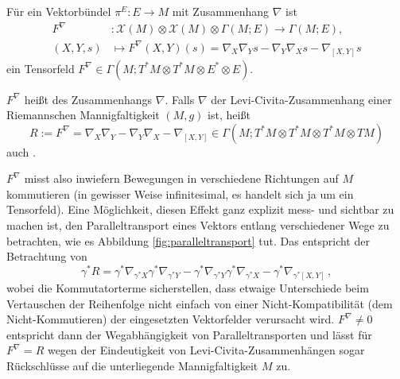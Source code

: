 \begin{satz}
Für ein Vektorbündel $\pi^E: E \rightarrow M$ mit Zusammenhang $\nabla$ ist
\begin{equation}
\begin{split}
F^\nabla&: \mathcal{X}(M) \otimes \mathcal{X}(M) \otimes \Gamma(M; E) \rightarrow \Gamma(M; E),
\\
(X, Y, s) &\mapsto F^\nabla(X, Y)(s) = \nabla_X \nabla_Y s - \nabla_Y \nabla_X s - \nabla_{[X, Y]} s
\end{split}
\end{equation}
ein Tensorfeld $F^\nabla \in \Gamma(M; T^* M \otimes T^* M \otimes E^* \otimes E)$.
\end{satz}

\begin{defi}
$F^\nabla$ heißt  des Zusammenhangs $\nabla$. Falls $\nabla$ der Levi-Civita-Zusammenhang einer Riemannschen Mannigfaltigkeit $(M, g)$ ist, heißt
\begin{equation}
R := F^\nabla = \nabla_X \nabla_Y - \nabla_Y \nabla_X - \nabla_{[X, Y]} \in \Gamma(M; T^* M \otimes T^* M \otimes T^* M \otimes TM)
\end{equation}
auch .
\end{defi}

$F^\nabla$ misst also inwiefern Bewegungen in verschiedene Richtungen auf $M$ kommutieren (in gewisser Weise infinitesimal, es handelt sich ja um ein Tensorfeld). Eine Möglichkeit, diesen Effekt ganz explizit mess- und sichtbar zu machen ist, den Paralleltransport eines Vektors entlang verschiedener Wege zu betrachten, wie es Abbildung \ref{fig:paralleltransport} tut. Das entspricht der Betrachtung von
\begin{equation*}
\gamma^* R = \gamma^* \nabla_{\gamma^* X} \gamma^* \nabla_{\gamma^* Y} - \gamma^* \nabla_{\gamma^* Y} \gamma^* \nabla_{\gamma^* X} - \gamma^* \nabla_{\gamma^* [X, Y]} \, ,
\end{equation*}
wobei die Kommutatorterme sicherstellen, dass etwaige Unterschiede beim Vertauschen der Reihenfolge nicht einfach von einer Nicht-Kompatibilität (dem Nicht-Kommutieren) der eingesetzten Vektorfelder verursacht wird. $F^\nabla \neq 0$ entspricht dann der Wegabhängigkeit von Paralleltransporten und lässt für $F^\nabla = R$ wegen der Eindeutigkeit von Levi-Civita-Zusammenhängen sogar Rückschlüsse auf die unterliegende Mannigfaltigkeit $M$ zu.


